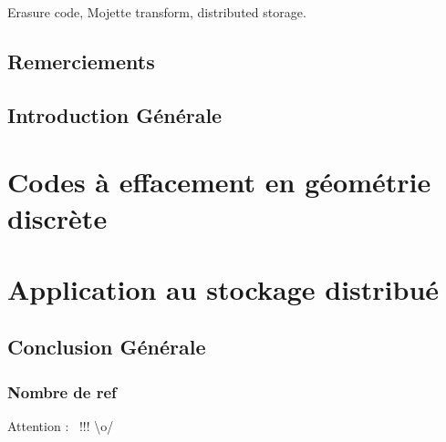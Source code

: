 \begin{keywords}
    Erasure code, Mojette transform, distributed storage.
\end{keywords}

\maketitle

\chapter*{Remerciements}

\lipsum[1-2]

\newpage

\dominitoc
\tableofcontents

\chapter*{Introduction Générale}



\part{Codes à effacement en géométrie discrète}







\part{Application au stockage distribué}







\chapter*{Conclusion Générale}



\printbibliography[
]



\section*{Nombre de ref}
Attention : \ !!! \textbackslash{}o/

\backmatter


